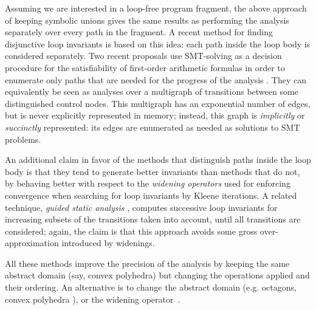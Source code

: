 Assuming we are  interested in a loop-free program fragment, the above approach of keeping symbolic unions gives the same results as performing the analysis separately over every path in the fragment.
A recent method for finding disjunctive loop invariants \cite{DBLP:conf/pldi/GulwaniZ10} is based on this idea: each path inside the loop body is considered separately.
Two recent proposals use SMT-solving \cite{Kroening_Strichman_08} as a decision procedure for the satisfiability of first-order arithmetic formulas in order to enumerate only paths that are needed for the progress of the analysis \cite{Gawlitza_Monniaux_ESOP11,Monniaux_Gonnord_SAS11}. They can equivalently be seen as analyses over a multigraph of transitions between some distinguished control nodes. This multigraph has an exponential number of edges, but is never explicitly represented in memory; instead, this graph is \emph{implicitly} or \emph{succinctly} represented: its edges are enumerated as needed as solutions to SMT problems.

An additional claim in favor of the methods that distinguish paths inside the loop body \cite{DBLP:conf/pldi/GulwaniZ10,Monniaux_Gonnord_SAS11} is that they tend to generate better invariants than methods that do not, by behaving better with respect to the \emph{widening operators} \cite{CousotCousot_JLC92}
used for enforcing convergence when searching for loop invariants by Kleene iterations. A related technique, \emph{guided static analysis} \cite{DBLP:conf/sas/GopanR07}, computes successive loop invariants for increasing subsets of the transitions taken into account, until all transitions are considered; again, the claim is that this approach avoids some gross over-approximation introduced by widenings.

All these methods improve the precision of the analysis by keeping the
same abstract domain (say, convex polyhedra) but changing the
operations applied and their ordering. An alternative is to change the
abstract domain (e.g. octagons, convex polyhedra
\cite{DBLP:journals/lisp/Mine06}), or the widening
operator~\cite{BagnaraHRZ05SCP,Polka:FMSD:97}.


